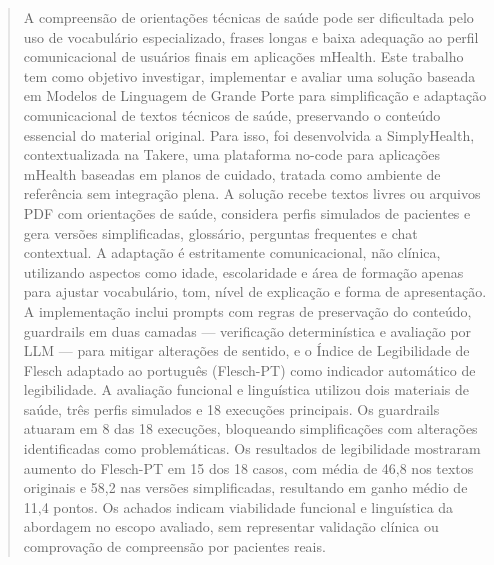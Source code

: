 \begin{abstract}
A compreensão de orientações técnicas de saúde pode ser dificultada pelo uso de vocabulário especializado, frases longas e baixa adequação ao perfil comunicacional de usuários finais em aplicações mHealth. Este trabalho tem como objetivo investigar, implementar e avaliar uma solução baseada em Modelos de Linguagem de Grande Porte para simplificação e adaptação comunicacional de textos técnicos de saúde, preservando o conteúdo essencial do material original. Para isso, foi desenvolvida a SimplyHealth, contextualizada na Takere, uma plataforma no-code para aplicações mHealth baseadas em planos de cuidado, tratada como ambiente de referência sem integração plena. A solução recebe textos livres ou arquivos PDF com orientações de saúde, considera perfis simulados de pacientes e gera versões simplificadas, glossário, perguntas frequentes e chat contextual. A adaptação é estritamente comunicacional, não clínica, utilizando aspectos como idade, escolaridade e área de formação apenas para ajustar vocabulário, tom, nível de explicação e forma de apresentação. A implementação inclui prompts com regras de preservação do conteúdo, guardrails em duas camadas — verificação determinística e avaliação por LLM — para mitigar alterações de sentido, e o Índice de Legibilidade de Flesch adaptado ao português (Flesch-PT) como indicador automático de legibilidade. A avaliação funcional e linguística utilizou dois materiais de saúde, três perfis simulados e 18 execuções principais. Os guardrails atuaram em 8 das 18 execuções, bloqueando simplificações com alterações identificadas como problemáticas. Os resultados de legibilidade mostraram aumento do Flesch-PT em 15 dos 18 casos, com média de 46,8 nos textos originais e 58,2 nas versões simplificadas, resultando em ganho médio de 11,4 pontos. Os achados indicam viabilidade funcional e linguística da abordagem no escopo avaliado, sem representar validação clínica ou comprovação de compreensão por pacientes reais.
\end{abstract}
